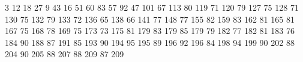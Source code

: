 3 12
18 27
9 43
16 51
60 83
57 92
47 101
67 113
80 119
71 120
79 127
75 128
71 130
75 132
79 133
72 136
65 138
66 141
77 148
77 155
82 159
83 162
81 165
81 167
75 168
78 169
75 173
73 175
81 179
83 179
85 179
79 182
77 182
81 183
76 184
90 188
87 191
85 193
90 194
95 195
89 196
92 196
84 198
94 199
90 202
88 204
90 205
88 207
88 209
87 209
